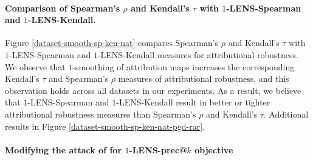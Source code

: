 \documentclass[letterpaper]{article} %
\begin{document}
\paragraph{Comparison of Spearman's $\rho$ and Kendall's $\tau$ with $1$-LENS-Spearman and $1$-LENS-Kendall.} 
Figure \ref{dataset-smooth-sp-ken-nat} compares Spearman's $\rho$ and Kendall's $\tau$ with $1$-LENS-Spearman and $1$-LENS-Kendall measures for attributional robustness. We observe that $1$-smoothing of attribution maps increases the corresponding Kendall's $\tau$ and Spearman's $\rho$ measures of attributional robustness, and this observation holds across all datasets in our experiments. As a result, we believe that $1$-LENS-Spearman and $1$-LENS-Kendall result in better or tighter attributional robustness measures than Spearman's $\rho$ and Kendall's $\tau$. Additional results in Figure \ref{dataset-smooth-sp-ken-nat-pgd-rar}. 

\paragraph{Modifying the attack of \citet{ghorbani2018interpretation} for $1$-LENS-prec@$k$ objective}

\end{document}
